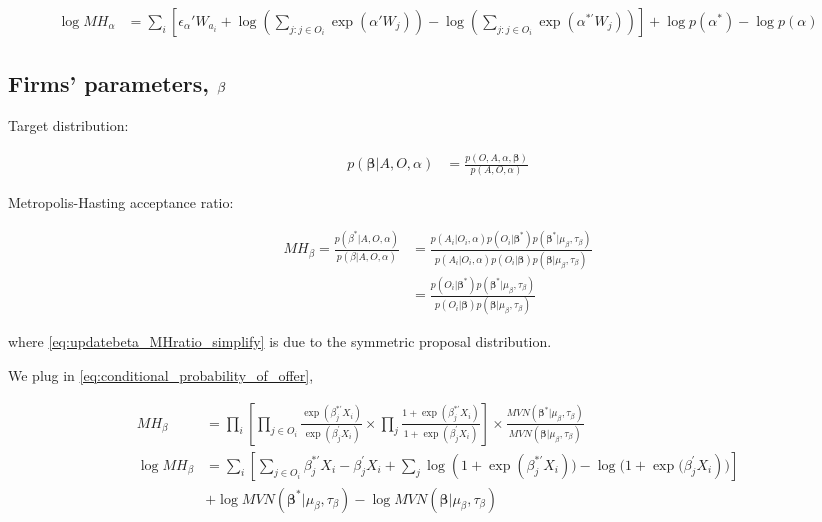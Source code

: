 \begin{align}
\log MH_\alpha &= \sum_i \left[ \epsilon_\alpha' W_{a_i} + \log\left(\sum\limits_{j:j \in O_i} \exp(\alpha' W_j)\right) - \log\left(\sum\limits_{j:j \in O_i} \exp(\alpha^{*\prime} W_j)\right) \right] + \log p(\alpha^*) - \log p(\alpha)
\end{align}

\subsection{Firms' parameters, \texorpdfstring{$\boldmath\beta$}{beta}}

Target distribution:

\begin{align}
p(\bm{\beta}|A, O, \alpha) &= \frac{p(O, A, \alpha, \bm{\beta})}{p(A, O, \alpha)}
\end{align}

Metropolis-Hasting acceptance ratio:

\begin{align}
MH_\beta = \frac{p(\beta^* | A, O, \alpha)}{p(\beta | A, O, \alpha)} &= \frac{p(A_i | O_i, \alpha)p(O_i|\bm{\beta}^*)p(\bm{\beta}^*|\mu_{\beta}, \tau_{\beta})}{p(A_i | O_i, \alpha)p(O_i|\bm{\beta})p(\bm{\beta}|\mu_{\beta}, \tau_{\beta})} \label{eq:updatebeta_MHratio_simplify} \\
&= \frac{p(O_i|\bm{\beta}^*)p(\bm{\beta}^*|\mu_{\beta}, \tau_{\beta})}{p(O_i|\bm{\beta})p(\bm{\beta}|\mu_{\beta}, \tau_{\beta})} \label{eq:updatebeta_MHratio_final}
\end{align}

where \eqref{eq:updatebeta_MHratio_simplify} is due to the symmetric proposal distribution.

We plug in \eqref{eq:conditional_probability_of_offer},

\begin{align}
MH_\beta &= \prod_i \left[ \prod\limits_{j \in O_i}\frac{ \exp(\beta_j^{*\prime}X_i)}{ \exp(\beta_j^{\prime}X_i)} \times \prod\limits_{j}\frac{1 + \exp(\beta_j^{*\prime}X_i)}{1 + \exp(\beta_j^{\prime}X_i)} \right] \times \frac{MVN(\bm{\beta}^*|\mu_{\beta}, \tau_{\beta})}{MVN(\bm{\beta}|\mu_{\beta}, \tau_{\beta})} \\
  \log MH_\beta &= \sum_i \left[ \sum_{j \in O_i} \beta_j^{*\prime}X_i - \beta_j^{\prime}X_i + \sum_{j} \log(1 + {\exp({\beta_j^{*\prime}X_i})) - \log(1 +  \exp(\beta_j^{\prime}X_i})) \right] \\
 & + \log MVN(\bm{\beta}^*|\mu_{\beta}, \tau_{\beta}) - \log MVN(\bm{\beta}|\mu_{\beta}, \tau_{\beta}) \nonumber
\end{align}

